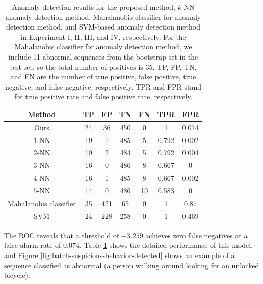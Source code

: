 \begin{table}[t]
  \caption[Anomaly detection results for the proposed method, $k$-NN
    anomaly detection method, Mahalanobis classifier for anomaly detection method, and
    SVM-based anomaly detection method in Experiment I, II, III, and
    IV, respectively.]{\small Anomaly detection results for the
    proposed method, $k$-NN anomaly detection method, Mahalanobis classifier for 
    anomaly detection method, and SVM-based anomaly detection method
    in Experiment I, II, III, and IV, respectively. For the Mahalanobis classifier for 
    anomaly detection method, we include 11 abnormal sequences from
    the bootstrap set in the test set, so the total number of
    positives is 35. TP, FP, TN, and FN are the number of true positive, 
    false positive, true negative, and false negative, respectively. 
    TPR and FPR stand for true positive rate and false positive rate, 
    respectively.}
  \begin{center}
    \begin{tabular}{c|c|c|c|c|c|c}
      \hline
      Method & TP & FP & TN & FN & TPR & FPR \\
      \hline\hline
      Ours & 24 & 36 & 450 & 0 & 1 & 0.074 \\ \hline
      $1$-NN & 19 & 1 & 485 & 5 & 0.792 & 0.002 \\ \hline
      $2$-NN & 19 & 2 & 484 & 5 & 0.792 & 0.004 \\ \hline
      $3$-NN & 16 & 0 & 486 & 8 & 0.667 & 0 \\ \hline
      $4$-NN & 16 & 1 & 485 & 8 & 0.667 & 0.002 \\ \hline
      $5$-NN & 14 & 0 & 486 & 10 & 0.583 & 0 \\ \hline
      Mahalanobis classifier & 35 & 421 & 65 & 0 & 1 & 0.87 \\ \hline
      SVM & 24 & 228 & 258 & 0 & 1 & 0.469 \\ \hline
    \end{tabular}
  \end{center}
  \label{tab:batch-detection-results}
\end{table}

The ROC reveals that a threshold of $-3.259$ achieves zero false
negatives at a false alarm rate of 0.074.
Table \ref{tab:batch-detection-results} shows the detailed performance
of this model, and Figure \ref{fig:batch-suspicious-behavior-detected}
shows an example of a sequence classified as abnormal (a person
walking around looking for an unlocked bicycle).

